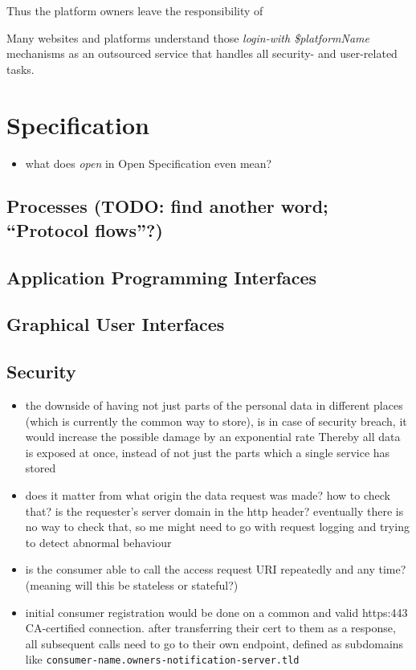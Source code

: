 \documentclass[12pt,english,a4paper,titlepage,cleardoublepage=empty,dottedtoc]{report}
\providecommand{\tightlist}{%
  \setlength{\itemsep}{0pt}\setlength{\parskip}{0pt}}
\begin{document}
Thus the platform owners leave the responsibility of

Many websites and platforms understand those \emph{login-with
\$platformName} mechanisms as an outsourced service that handles all
security- and user-related tasks.

\chapter{Specification}\label{specification}

\begin{itemize}
\tightlist
\item
  what does \emph{open} in Open Specification even mean?
\end{itemize}

\section{\texorpdfstring{Processes (TODO: find another word; ``Protocol
flows''?)}{Processes (TODO: find another word; Protocol flows?)}}\label{processes-todo-find-another-word-protocol-flows}

\section{Application Programming
Interfaces}\label{application-programming-interfaces}

\section{Graphical User Interfaces}\label{graphical-user-interfaces}

\section{Security}\label{security}

\begin{itemize}
\item
  the downside of having not just parts of the personal data in
  different places (which is currently the common way to store), is in
  case of security breach, it would increase the possible damage by an
  exponential rate Thereby all data is exposed at once, instead of not
  just the parts which a single service has stored
\item
  does it matter from what origin the data request was made? how to
  check that? is the requester's server domain in the http header?
  eventually there is no way to check that, so me might need to go with
  request logging and trying to detect abnormal behaviour
\item
  is the consumer able to call the access request URI repeatedly and any
  time? (meaning will this be stateless or stateful?)
\item
  initial consumer registration would be done on a common and valid
  https:443 CA-certified connection. after transferring their cert to
  them as a response, all subsequent calls need to go to their own
  endpoint, defined as subdomains like
  \texttt{consumer-name.owners-notification-server.tld}
\end{itemize}
\end{document}
